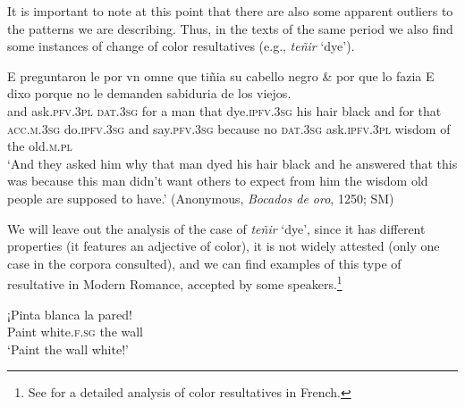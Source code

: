 \documentclass[output=paper,colorlinks,citecolor=brown,
]{langscibook}
\begin{document}
It is important to note at this point that there are also some apparent outliers to the patterns we are describing. Thus, in the texts of the same period we also find some instances of change of color resultatives (e.g., \textit{teñir} ‘dye’).

\ea
  \gll E preguntaron le por vn omne que tiñia su cabello negro \& por que lo fazia E dixo porque no le demanden sabiduria de los viejos.\\
and ask.\textsc{pfv}.\textsc{3pl} \textsc{dat}.\textsc{3sg} for a man that dye.\textsc{ipfv}.\textsc{3sg} his hair black and for that \textsc{acc}.\textsc{m}.\textsc{3sg} do.\textsc{ipfv}.\textsc{3sg} and say.\textsc{pfv}.\textsc{3sg} because no \textsc{dat}.\textsc{3sg} ask.\textsc{ipfv}.\textsc{3pl} wisdom of the old.\textsc{m}.\textsc{pl} \\
  \glt `And they asked him why that man dyed his hair black and he answered that this was because this man didn't want others to expect from him the wisdom old people are supposed to have.' (Anonymous, \textit{Bocados de oro}, 1250; SM)
\z 



\noindent We will leave out the analysis of the case of \textit{teñir} ‘dye’, since it has different properties (it features an adjective of color), it is not widely attested (only one case in the corpora consulted), and we can find examples of this type of resultative in Modern Romance, accepted by some speakers.\footnote{See \citet{Lawersetal2019} for a detailed analysis of color resultatives in French.}

\ea
  \gll ¡Pinta blanca la pared!\\
Paint white.\textsc{f}.\textsc{sg} the wall\\
  \glt `Paint the wall white!'
\z 
\end{document}
